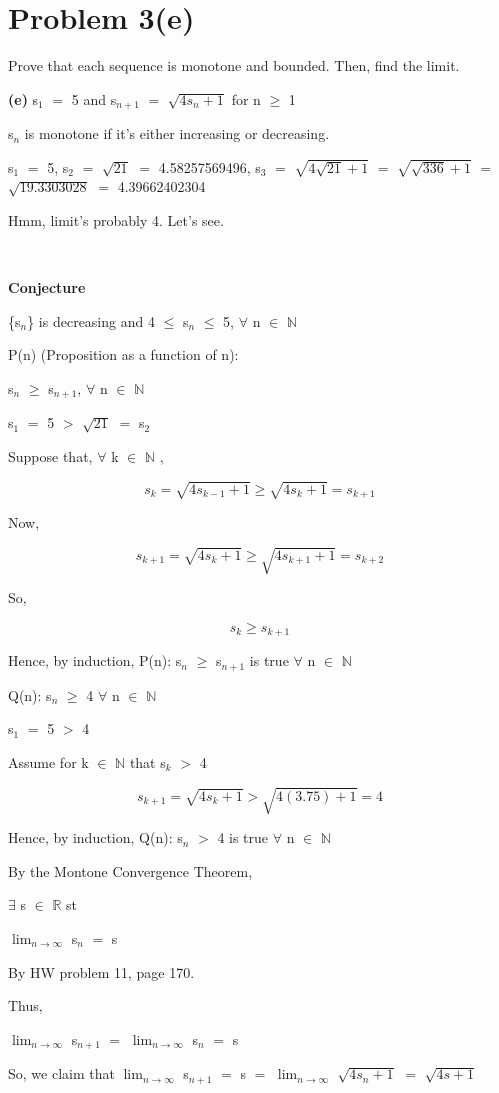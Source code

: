 \documentclass{article}
\newcommand{\mt}[1]{\ensuremath{#1}}
\newcommand\bsc[2][\DefaultOpt]{%
  \def\DefaultOpt{#2}%
  \section[#1]{#2}%
}
\newcommand{\bpth}[1]{\textbf{(#1)}}
\newcommand{\br}{\mt{\mathbb{R}} }       %
\newcommand{\bn}{\mt{\mathbb{N}} }       %
\newcommand{\fa}{\mt{\forall} }          %
\newcommand{\mem}{\mt{\in} }
\newcommand{\exs}{\mt{\exists} }
\newcommand{\bk}[1]{\{#1\}}
\newcommand{\gr}{\mt{>} }
\newcommand{\lse}{\mt{\leq} }
\newcommand{\gre}{\mt{\geq} }
\newcommand{\eql}{\mt{=} }
\newcommand{\uw}[2]{#1\mt{_{#2}}}
\newcommand{\lmti}[1]{\mt{\displaystyle{\lim_{#1 \to \infty}}}}
\newcommand{\eqn}[1]{\[#1\]}
\begin{document}
\bsc{Problem 3(e)}{
Prove that each sequence is monotone and bounded. Then, find the limit.

\bpth{e} \uw{s}{1} \eql 5 and \uw{s}{n + 1} \eql $\sqrt{4\uw{s}{n} + 1}$ for n \gre 1

\uw{s}{n} is monotone if it's either increasing or decreasing.

\uw{s}{1} \eql 5, \uw{s}{2} \eql $\sqrt{21}$ \eql 4.58257569496, \uw{s}{3} \eql $\sqrt{4\sqrt{21} + 1}$ \eql $\sqrt{\sqrt{336} + 1}$ \eql $\sqrt{19.3303028}$ \eql 4.39662402304

Hmm, limit's probably 4. Let's see. \

\

\textbf{Conjecture}

\bk{\uw{s}{n}} is decreasing and 4 \lse \uw{s}{n} \lse 5, \fa n \mem \bn

P(n) (Proposition as a function of n):

\uw{s}{n} \gre \uw{s}{n + 1}, \fa n \mem \bn 

\uw{s}{1} \eql 5 \gr $\sqrt{21}$ \eql \uw{s}{2}

Suppose that, \fa k \mem \bn,

\eqn{s_{k} = \sqrt{4\uw{s}{k - 1} + 1} \gre \sqrt{4\uw{s}{k} + 1} = s_{k + 1}}

Now,

\eqn{s_{k + 1} = \sqrt{4\uw{s}{k} + 1} \gre \sqrt{4\uw{s}{k + 1} + 1} = s_{k + 2}}

So,

\eqn{s_k \gre s_{k + 1}}

Hence, by induction, P(n): \uw{s}{n} \gre \uw{s}{n + 1} is true \fa n \mem \bn 

Q(n): \uw{s}{n} \gre 4 \fa n \mem \bn

\uw{s}{1} \eql 5 \gr 4

Assume for k \mem \bn that \uw{s}{k} \gr 4

\eqn{s_{k + 1} = \sqrt{4\uw{s}{k} + 1} \gr \sqrt{4(3.75) + 1} = 4}

Hence, by induction, Q(n): \uw{s}{n} \gr 4 is true \fa n \mem \bn 

By the Montone Convergence Theorem,

\exs s \mem \br st

\lmti{n} \uw{s}{n} \eql s

By HW problem 11, page 170.

Thus,

\lmti{n} \uw{s}{n + 1} \eql \lmti{n} \uw{s}{n} \eql s

So, we claim that \lmti{n} \uw{s}{n + 1} \eql s \eql \lmti{n} $\sqrt{4s_n + 1}$ \eql $\sqrt{4s + 1}$

}
\end{document}
